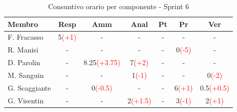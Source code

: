 \documentclass[a4paper,12pt]{article}
\begin{document}
\begin{table}[H]
    \centering
    \renewcommand{\arraystretch}{1.4}
    \footnotesize
    \begin{tabularx}{\textwidth}{|l|C|C|C|C|C|C|}
        \hline
        \textbf{Membro} & \textbf{Resp} & \textbf{Amm} & \textbf{Anal} & \textbf{Pt} & \textbf{Pr} & \textbf{Ver} \\
        \hline
        F. Fracasso & 5\textcolor{red}{(+1)} & - & - & - & - & - \\
        \hline
        R. Manisi & - & - & - & - & 0\textcolor{red}{(-5)} & - \\
        \hline
        D. Parolin & - & 8.25\textcolor{red}{(+3.75)} & 7\textcolor{red}{(+2)} & - & - & - \\
        \hline
        M. Sanguin & - & - & 1\textcolor{red}{(-1)} & - & - & 0\textcolor{red}{(-2)} \\
        \hline
        G. Scaggiante & - & 0\textcolor{red}{(-0.5)} & - & - & 6\textcolor{red}{(+1)} & 0.5\textcolor{red}{(+0.5)} \\
        \hline
        G. Visentin & - & - & 2\textcolor{red}{(+1.5)} & - & 3\textcolor{red}{(-1)} & 2\textcolor{red}{(+1)} \\
        \hline
    \end{tabularx}
    \caption{Consuntivo orario per componente - Sprint 6}
    \label{tab:consuntivo_sprint6}
\end{table}
\end{document}
